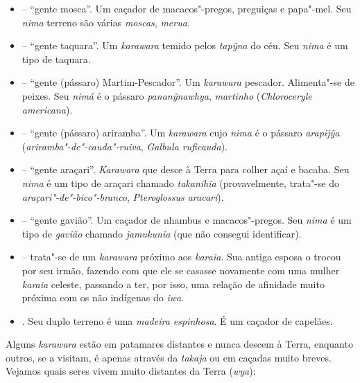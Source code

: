 \begin{itemize}
  Terra. Seu \emph{nima} é o \emph{urubu"-rei} (\emph{Sarcoramphus
  papa}).
\item
  \emph{} -- ``gente mosca''. Um caçador de macacos"-pregos, preguiças e
  papa"-mel. Seu \emph{nima} terreno são várias \emph{moscas},
  \emph{merua}.
\item
  \emph{} -- ``gente taquara''. Um \emph{karawara} temido pelos
  \emph{tapỹna} do céu. Seu \emph{nima} é um tipo de taquara.
\item
  \emph{} -- ``gente (pássaro) Martim-Pescador''. Um \emph{karawara} pescador.
  Alimenta"-se de peixes. Seu \emph{nimá} é o pássaro
  \emph{pananỹnawhya}, \emph{martinho} (\emph{Chloroceryle
  americana}).
\item
   -- ``gente (pássaro) ariramba''. Um \emph{karawara} cujo
  \emph{nima} é o pássaro \emph{arapijỹa}
  (\emph{ariramba"-de"-cauda"-ruiva}, \emph{Galbula ruficauda}).
\item
   -- ``gente araçari''. \emph{Karawara} que desce à Terra para
  colher açaí e bacaba. Seu \emph{nima} é um tipo de araçari chamado
  \emph{takanihĩa} (provavelmente, trata"-se do
  \emph{araçari"-de"-bico"-branco}, \emph{Pteroglossus aracari}).
\item
   -- ``gente gavião''. Um caçador de nhambus e
  macacos"-pregos. Seu \emph{nima} é um tipo de \emph{gavião} chamado
  \emph{jamukunia} (que não consegui identificar).
\item
  \emph{} -- trata"-se de um \emph{karawara} próximo aos
  \emph{karaia}. Sua antiga esposa o trocou por seu irmão, fazendo com
  que ele se casasse novamente com uma mulher \emph{karaia} celeste,
  passando a ter, por isso, uma relação de afinidade muito próxima com
  os não indígenas do \emph{iwa}.
\item
  \emph{}. Seu duplo terreno é uma \emph{madeira espinhosa}. É
  um caçador de capelães.
\end{itemize}

Alguns \emph{karawara} estão em patamares distantes e nunca descem à
Terra, enquanto outros, se a visitam, é apenas através da \emph{takaja}
ou em caçadas muito breves. Vejamos quais seres vivem muito distantes da
Terra (\emph{wya}):

